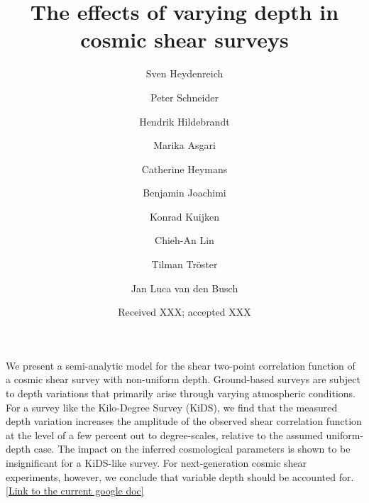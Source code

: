 \documentclass{aa}
\begin{document}
 


   \title{The effects of varying depth in cosmic shear surveys}


   \author{Sven Heydenreich%
          \and Peter Schneider 
          \and Hendrik Hildebrandt
          \and Marika Asgari
          \and Catherine Heymans 
          \and Benjamin Joachimi
          \and Konrad Kuijken
          \and Chieh-An Lin
          \and Tilman Tr\"{o}ster
          \and Jan Luca van den Busch
          }

   \date{Received XXX; accepted XXX}

  \abstract
   {We present a semi-analytic model for the shear two-point correlation function of a cosmic shear survey with non-uniform depth. Ground-based surveys are subject to depth variations that primarily arise through varying atmospheric conditions. For a survey like the Kilo-Degree Survey (KiDS), we find that the measured depth variation increases the amplitude of the observed shear correlation function at the level of a few percent out to degree-scales, relative to the assumed uniform-depth case. The impact on the inferred cosmological parameters is shown to be insignificant for a KiDS-like survey. For next-generation cosmic shear experiments, however, we conclude that variable depth should be accounted for. \textcolor{blue}{\href{https://docs.google.com/document/d/13j7fUE8jrK5HOVbf4p0HdQs6c14jbWtm9Yq8CtLZCK4/edit?usp=sharing}{[Link to the current google doc]}}}

\end{document}
